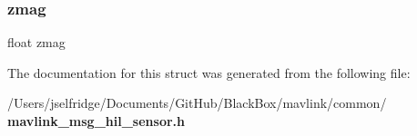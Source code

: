 \subsubsection{zmag}
{\footnotesize\ttfamily float zmag}



The documentation for this struct was generated from the following file\+:\begin{DoxyCompactItemize}
\item 
/\+Users/jselfridge/\+Documents/\+Git\+Hub/\+Black\+Box/mavlink/common/\textbf{ mavlink\+\_\+msg\+\_\+hil\+\_\+sensor.\+h}\end{DoxyCompactItemize}
